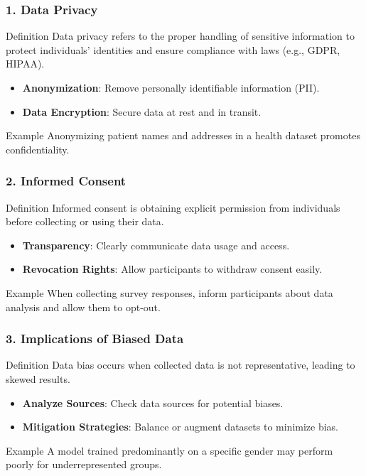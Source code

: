 \documentclass[aspectratio=169]{beamer}
\begin{document}
\begin{frame}[fragile]
    \frametitle{1. Data Privacy}
    \begin{block}{Definition}
        Data privacy refers to the proper handling of sensitive information to protect individuals' identities and ensure compliance with laws (e.g., GDPR, HIPAA).
    \end{block}
    \begin{itemize}
        \item \textbf{Anonymization}: Remove personally identifiable information (PII).
        \item \textbf{Data Encryption}: Secure data at rest and in transit.
    \end{itemize}
    \begin{block}{Example}
        Anonymizing patient names and addresses in a health dataset promotes confidentiality.
    \end{block}
\end{frame}

\begin{frame}[fragile]
    \frametitle{2. Informed Consent}
    \begin{block}{Definition}
        Informed consent is obtaining explicit permission from individuals before collecting or using their data.
    \end{block}
    \begin{itemize}
        \item \textbf{Transparency}: Clearly communicate data usage and access.
        \item \textbf{Revocation Rights}: Allow participants to withdraw consent easily.
    \end{itemize}
    \begin{block}{Example}
        When collecting survey responses, inform participants about data analysis and allow them to opt-out.
    \end{block}
\end{frame}

\begin{frame}[fragile]
    \frametitle{3. Implications of Biased Data}
    \begin{block}{Definition}
        Data bias occurs when collected data is not representative, leading to skewed results.
    \end{block}
    \begin{itemize}
        \item \textbf{Analyze Sources}: Check data sources for potential biases.
        \item \textbf{Mitigation Strategies}: Balance or augment datasets to minimize bias.
    \end{itemize}
    \begin{block}{Example}
        A model trained predominantly on a specific gender may perform poorly for underrepresented groups.
    \end{block}
\end{frame}
\end{document}

